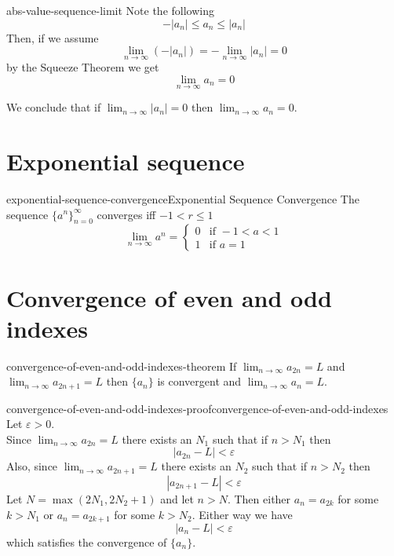 \documentclass[preview]{standalone}
\begin{document}
\begin{snippet}{abs-value-sequence-limit}
Note the following
\[
    -|a_n| \leq a_n \leq |a_n|
\]
Then, if we assume
\[
    \lim_{n\to\infty} (-|a_n|) = - \lim_{n\to\infty} |a_n| =0 
\]
by the Squeeze Theorem we get
\[
    \lim_{n\to\infty} a_n =0
\]

We conclude that if \(\lim_{n\to\infty} |a_n|=0\) then
\(\lim_{n\to\infty} a_n=0\).
\end{snippet}

\section{Exponential sequence} %

\begin{snippettheorem}{exponential-sequence-convergence}{Exponential Sequence Convergence}
    The sequence \({\{a^n\}}_{n=0}^\infty\) converges iff \(-1<r\leq 1\)
    \[
        \lim_{n\to\infty} a^n = \begin{cases}
            0 & \text{if } -1 < a < 1 \\
            1 & \text{if } a=1
        \end{cases}
    \]
\end{snippettheorem}

\section{Convergence of even and odd indexes}

\begin{snippettheorem}{convergence-of-even-and-odd-indexes-theorem}{}
    If \(\lim_{n\to\infty}a_{2n}=L\) and \(\lim_{n\to\infty}a_{2n+1}=L\)
    then \(\{a_n\}\) is convergent and \(\lim_{n\to\infty}a_n=L\).
\end{snippettheorem}

\begin{snippetproof}{convergence-of-even-and-odd-indexes-proof}{convergence-of-even-and-odd-indexes}{}
    Let \(\varepsilon>0\). \\
    Since \(\lim_{n\to\infty}a_{2n}=L\) there exists an \(N_1\) such that
    if \(n>N_1\) then
    \[
        |a_{2n}-L|<\varepsilon
    \]
    Also, since \(\lim_{n\to\infty}a_{2n+1}=L\) there exists an \(N_2\) such that
    if \(n>N_2\) then
    \[
        |a_{2n+1}-L|<\varepsilon
    \]
    Let \(N=\max(2N_1, 2N_2+1)\) and let \(n>N\).
    Then either \(a_n=a_{2k}\) for some \(k>N_1\) or \(a_n=a_{2k+1}\)
    for some \(k>N_2\). Either way we have
    \[
        |a_n-L|<\varepsilon
    \]
    which satisfies the convergence of \(\{a_n\}\).
\end{snippetproof}
\end{document}
